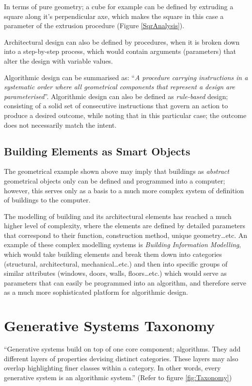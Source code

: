 In terms of pure geometry; a cube for example can be defined by extruding a square along it's perpendicular axe, which makes the square in this case a parameter of the extrusion procedure (Figure \ref{SqrAnalysis}).

Architectural design can also be defined by procedures, when it is broken down into a step-by-step process, which would contain arguments (parameters) that alter the design with variable values. \label{SequentialAlgorithms}

Algorithmic design can be summarised as: ``\emph{A procedure carrying instructions in a systematic order where all geometrical components that represent a design are parameterised}''\cite{hernandez06}. Algorithmic design can also be defined as \emph{rule-based} design; consisting of a solid set of consecutive instructions that govern an action to produce a desired outcome, while noting that in this particular case; the outcome does not necessarily match the intent.

\subsection{Building Elements as Smart Objects}

The geometrical example shown above may imply that buildings as \emph{abstract} geometrical objects only can be defined and programmed into a computer; however, this serves only as a basis to a much more complex system of definition of buildings to the computer. 

The modelling of building and its architectural elements has reached a much higher level of complexity, where the elements are defined by detailed parameters that correspond to their function, construction method, unique geometry\ldots{}etc. An example of these complex modelling systems is \emph{Building Information Modelling}, which would take building elements and break them down into categories (structural, architectural, mechanical\ldots{}etc.) and then into specific groups of similar attributes (windows, doors, walls, floors\ldots{}etc.) which would serve as parameters that can easily be programmed into an algorithm, and therefore serve as a much more sophisticated platform for algorithmic design.

\section{Generative Systems Taxonomy}

\label{GenSysTax}
``Generative systems build on top of one core component; algorithms. They add different layers of properties devising distinct categories. These layers may also overlap highlighting finer classes within a category. In other words, every generative system is an algorithmic system.'' \cite{khaldi04} (Refer to figure \ref{fig:Taxonomy})

